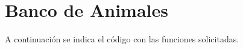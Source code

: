 \section{Banco de Animales}

  A continuación se indica el código con las funciones
  solicitadas.
  
    